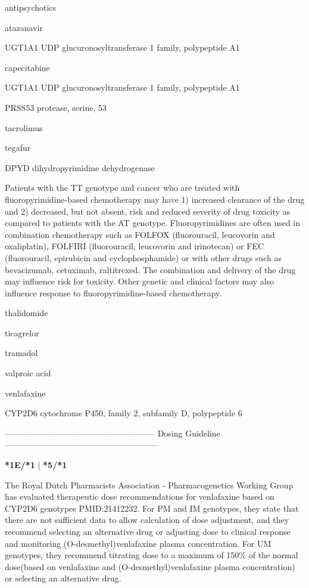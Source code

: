 \documentclass{resume} %
\begin{document}
\begin{rSection}{ antipsychotics }
\begin{rSection}{ atazanavir }
\begin{rSubsection}{ UGT1A1 }{ UDP glucuronosyltransferase 1 family, polypeptide A1 }{}{}
\begin{rSection}{ capecitabine }
\begin{rSubsection}{ UGT1A1 }{ UDP glucuronosyltransferase 1 family, polypeptide A1 }{}{}
\begin{rSubsection}{ PRSS53 }{ protease, serine, 53 }{}{}
\begin{rSection}{ tacrolimus }
\begin{rSection}{ tegafur }
\begin{rSubsection}{ DPYD }{ dihydropyrimidine dehydrogenase }{}{}
\item[] Patients with the TT genotype and cancer who are treated with fluoropyrimidine-based chemotherapy may have 1) increased clearance of the drug and 2) decreased, but not absent, risk and reduced severity of drug toxicity as compared to patients with the AT genotype. Fluoropyrimidines are often used in combination chemotherapy such as FOLFOX (fluorouracil, leucovorin and oxaliplatin), FOLFIRI (fluorouracil, leucovorin and irinotecan) or FEC (fluorouracil, epirubicin and cyclophosphamide) or with other drugs such as bevacizumab, cetuximab, raltitrexed. The combination and delivery of the drug may influence risk for toxicity. Other genetic and clinical factors may also influence response to fluoropyrimidine-based chemotherapy.
\end{rSubsection}
\end{rSection}\begin{rSection}{ thalidomide }
\item[]
\begin{rSection}{ ticagrelor }
\item[]
\begin{rSection}{ tramadol }
\item[]
\begin{rSection}{ valproic acid }
\item[]
\begin{rSection}{ venlafaxine }
\item[]
\begin{rSubsection}{ CYP2D6 }{ cytochrome P450, family 2, subfamily D, polypeptide 6 }{}{}
\item[]
\item[] ------------------------------------------------------ Dosing Guideline --------------------------------------------------------\newline
\item[]
\item[] \textbf{ *1E/*1 } | \textbf{ *5/*1 }
\item The Royal Dutch Pharmacists Association - Pharmacogenetics Working Group has evaluated therapeutic dose recommendations for venlafaxine based on CYP2D6 genotypes PMID:21412232.  For PM and IM genotypes, they state that there are not sufficient data to allow calculation of dose adjustment, and they recommend selecting an alternative drug or adjusting dose to clinical response and monitoring (O-desmethyl)venlafaxine plasma concentration.  For UM genotypes, they recommend titrating dose to a maximum of 150\% of the normal dose(based on venlafaxine and (O-desmethyl)venlafaxine plasma concentration) or selecting an alternative drug.

\end{rSubsection}
\end{rSection}
\end{rSection}
\end{rSection}
\end{rSection}
\end{rSection}
\end{rSection}
\end{rSubsection}
\end{rSubsection}
\end{rSection}
\end{rSubsection}
\end{rSection}
\end{rSection}
\end{document}
